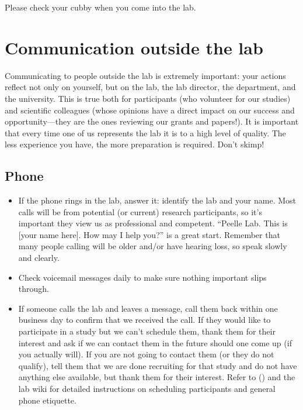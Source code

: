 \documentclass[letterpaper,12pt,oneside]{memoir}
\begin{document}
Please check your cubby when you come into the lab.


\section{Communication outside the lab}

Communicating to people outside the lab is extremely important: your actions reflect not only on yourself, but on the lab, the lab director, the department, and the university. This is true both for participants (who volunteer for our studies) and scientific colleagues (whose opinions have a direct impact on our success and opportunity---they are the ones reviewing our grants and papers!). It is important that every time one of us represents the lab it is to a high level of quality. The less experience you have, the more preparation is required. Don't skimp!

\subsection{Phone}

\begin{itemize}
\item If the phone rings in the lab, answer it: identify the lab and your name. Most calls will be from potential (or current) research participants, so it's important they view us as professional and competent. ``Peelle Lab. This is [your name here]. How may I help you?'' is a great start. Remember that many people calling will be older and/or have hearing loss, so speak slowly and clearly.

\item Check voicemail messages daily to make sure nothing important slips through.

\item If someone calls the lab and leaves a message, call them back within one business day to confirm that we received the call. If they would like to participate in a study but we can't schedule them, thank them for their interest and ask if we can contact them in the future should one come up (if you actually will). If you are not going to contact them (or they do not qualify), tell them that we are done recruiting for that study and do not have anything else available, but thank them for their interest. Refer to  () and the lab wiki for detailed instructions on scheduling participants and general phone etiquette.

\end{itemize}
\end{document}
